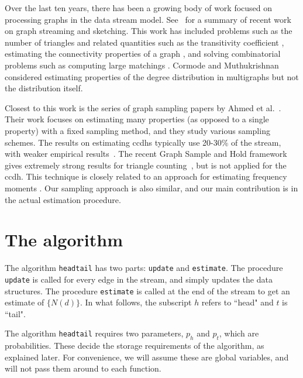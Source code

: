 \documentclass[11pt]{article}
\theoremstyle{definition}
\newcommand{\degdist}{{\tt headtail}}
\newcommand{\update}{{\tt update}}
\newcommand{\est}{{\tt estimate}}
\begin{document}
Over the last ten years, there has been a growing body of work focused on processing graphs in the data stream model. See~\cite{mcgregor2014graph} for a summary of recent work on graph streaming and sketching. This work has included problems such as the number of triangles and related quantities such as the transitivity coefficient \cite{jha2013space,PavanTTW13,ahmed2014graph}, estimating the connectivity properties of a graph \cite{GuhaMT15}, and solving combinatorial problems such as computing large matchings \cite{KapralovKS14,McGregor05}.
Cormode and Muthukrishnan considered estimating properties of the degree
distribution in multigraphs but not the distribution itself\cite{CormodeM05}.

Closest to this work is the series of graph sampling papers by Ahmed et al.~\cite{ayman2013ads,ahmed12socialnets,ahmed2014network,ahmed2014graph}.
Their work focuses on estimating many properties (as opposed to a single property) with a fixed sampling method, and they study various sampling schemes.
The results on estimating ccdhs typically use 20-30\% of the stream, with weaker empirical results~\cite{ayman2013ads}.
The recent Graph Sample and Hold framework gives extremely strong results for triangle counting~\cite{ahmed2014graph}, but is
not applied for the ccdh.
This technique is closely related to an approach for estimating frequency moments
\cite{AlonMS99,braverman2013approximating}. Our sampling approach is also similar, and our main
contribution is in the actual estimation procedure.








\section{The algorithm}

The algorithm \degdist{} has two parts: \update{} and \est.
The procedure \update{} is called for every edge in the stream, and simply
updates the data structures. The procedure \est{} is called at the end
of the stream to get an estimate of $\{N(d)\}$. In what follows,
the subscript $h$ refers to ``head" and $t$ is ``tail".

The algorithm \degdist{} requires two parameters, $p_h$ and $p_t$, which
are probabilities. These decide the storage requirements of the algorithm,
as explained later. For convenience, we will assume these are global variables,
and will not pass them around to each function.
\end{document}
